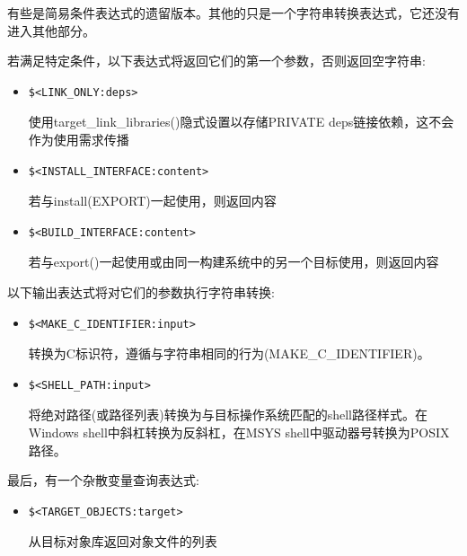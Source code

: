 有些是简易条件表达式的遗留版本。其他的只是一个字符串转换表达式，它还没有进入其他部分。

若满足特定条件，以下表达式将返回它们的第一个参数，否则返回空字符串:

\begin{itemize}
\item 
\begin{lstlisting}[style=styleCMake]
$<LINK_ONLY:deps>
\end{lstlisting}

使用target\_link\_libraries()隐式设置以存储PRIVATE deps链接依赖，这不会作为使用需求传播

\item 
\begin{lstlisting}[style=styleCMake]
$<INSTALL_INTERFACE:content>
\end{lstlisting}

若与install(EXPORT)一起使用，则返回内容

\item 
\begin{lstlisting}[style=styleCMake]
$<BUILD_INTERFACE:content> 
\end{lstlisting}

若与export()一起使用或由同一构建系统中的另一个目标使用，则返回内容
\end{itemize}

以下输出表达式将对它们的参数执行字符串转换:

\begin{itemize}
\item 
\begin{lstlisting}[style=styleCMake]
$<MAKE_C_IDENTIFIER:input> 
\end{lstlisting}

转换为C标识符，遵循与字符串相同的行为(MAKE\_C\_IDENTIFIER)。

\item 
\begin{lstlisting}[style=styleCMake]
$<SHELL_PATH:input>
\end{lstlisting}

将绝对路径(或路径列表)转换为与目标操作系统匹配的shell路径样式。在Windows shell中斜杠转换为反斜杠，在MSYS shell中驱动器号转换为POSIX路径。
\end{itemize}

最后，有一个杂散变量查询表达式:

\begin{itemize}
\item 
\begin{lstlisting}[style=styleCMake]
$<TARGET_OBJECTS:target> 
\end{lstlisting}

从目标对象库返回对象文件的列表
\end{itemize}

